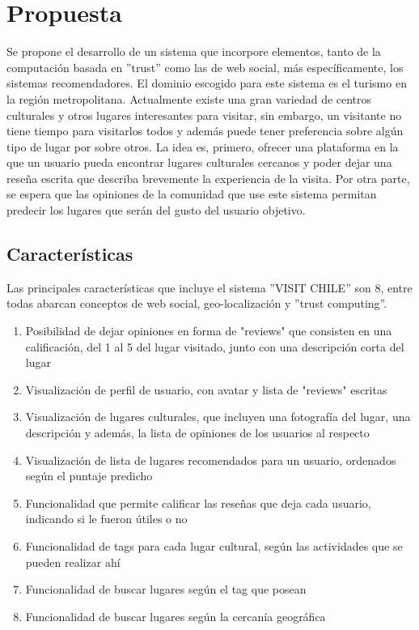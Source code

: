 \chapter{Propuesta}

Se propone el desarrollo de un sistema que incorpore elementos, tanto de la computación basada en ''trust'' como las de web social, más específicamente, los sistemas recomendadores. El dominio escogido para este sistema es el turismo en la región metropolitana. Actualmente existe una gran variedad de centros culturales y otros lugares interesantes para visitar, sin embargo, un visitante no tiene tiempo para visitarlos todos y además puede tener preferencia sobre algún tipo de lugar por sobre otros. La idea es, primero, ofrecer una plataforma en la que un usuario pueda encontrar lugares culturales cercanos y poder dejar una reseña escrita que describa brevemente la experiencia de la visita. Por otra parte, se espera que las opiniones de la comunidad que use este sistema permitan predecir los lugares que serán del gusto del usuario objetivo. 

\section{Características}
Las principales características que incluye el sistema ''VISIT CHILE'' son 8, entre todas abarcan conceptos de web social, geo-localización y ''trust computing''.

\begin{enumerate}
\item{Posibilidad de dejar opiniones en forma de "reviews" que consisten en una calificación, del 1 al 5 del lugar visitado, junto con una descripción corta del lugar }
\item{Visualización de perfil de usuario, con avatar y lista de "reviews" escritas}
\item{Visualización de lugares culturales, que incluyen una fotografía del lugar, una descripción y además, la lista de opiniones de los usuarios al respecto}
\item{Visualización de lista de lugares recomendados para un usuario, ordenados según el puntaje predicho}
\item{Funcionalidad que permite calificar las reseñas que deja cada usuario, indicando si le fueron útiles o no}
\item{Funcionalidad de tags para cada lugar cultural, según las actividades que se pueden realizar ahí}
\item{Funcionalidad de buscar lugares según el tag que posean}
\item{Funcionalidad de buscar lugares según la cercanía geográfica}
\end{enumerate}

